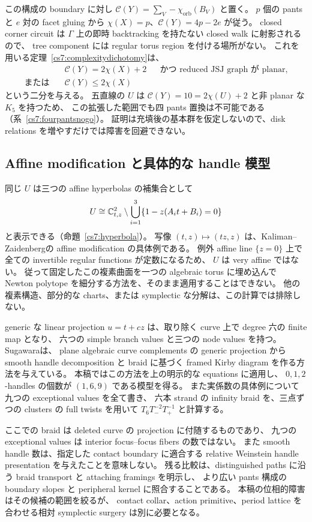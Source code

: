 この構成の boundary に対し
$\mathcal C(Y)=\sum_V-\chi_{\mathrm{orb}}(B_V)$ と置く。
$p$ 個の pants と $e$ 対の facet gluing から
$\chi(X)=p$、$\mathcal C(Y)=4p-2e$ が従う。
closed corner circuit は $\Gamma$ 上の即時 backtracking を持たない closed walk に射影されるので、
tree component には regular torus region を付ける場所がない。
これを用いる定理~\ref{cs7:complexitydichotomy}は、
\[
 \begin{aligned}
 &\mathcal C(Y)=2\chi(X)+2
   &&\text{かつ reduced JSJ graph が planar},\\
 \text{または}\quad
 &\mathcal C(Y)\leq2\chi(X)
 \end{aligned}
\]
という二分を与える。
五直線の $U$ は $\mathcal C(Y)=10=2\chi(U)+2$ と非 planar な $K_5$ を持つため、
この拡張した範囲でも四 pants 置換は不可能である（系~\ref{cs7:fourpantsnogo}）。
証明は充填後の基本群を仮定しないので、disk relations を増やすだけでは障害を回避できない。

\subsection{Affine modification と具体的な handle 模型}

同じ $U$ は三つの affine hyperbolas の補集合として
\[
 U\cong\mathbb C^2_{t,z}\setminus
       \bigcup_{i=1}^3\{1-z(A_it+B_i)=0\}
\]
と表示できる（命題~\ref{cs7:hyperbola}）。
写像 $(t,z)\mapsto(tz,z)$ は、Kaliman--Zaidenberg\cite[\S\S1--3]{KalimanZaidenberg}の
affine modification の具体例である。
例外 affine line $\{z=0\}$ 上で全ての invertible regular functions が定数になるため、
$U$ は very affine ではない。
従って固定したこの複素曲面を一つの algebraic torus に埋め込んで
Newton polytope を細分する方法を、そのまま適用することはできない。
他の複素構造、部分的な charts、または symplectic な分解は、この計算では排除しない。

generic な linear projection $u=t+cz$ は、取り除く curve 上で degree 六の finite map となり、
六つの simple branch values と三つの node values を持つ。
Sugawara\cite[Proposition~3.1, Theorems~3.7 and~4.1]{Sugawara}は、
plane algebraic curve complements の generic projection から smooth handle decomposition と
braid に基づく framed Kirby diagram を作る方法を与えている。
本稿ではこの方法を上の明示的な equations に適用し、
$0,1,2$-handles の個数が $(1,6,9)$ である模型を得る。
また実係数の具体例について九つの exceptional values を全て書き、
六本 strand の infinity braid を、三点ずつの clusters の full twists を用いて
$T_6T_-^{-2}T_+^{-1}$ と計算する。

ここでの braid は deleted curve の projection に付随するものであり、
九つの exceptional values は interior focus--focus fibers の数ではない。
また smooth handle 数は、指定した contact boundary に適合する
relative Weinstein handle presentation を与えたことを意味しない。
残る比較は、distinguished paths に沿う braid transport と attaching framings を明示し、
より広い pants 構成の boundary slopes と peripheral kernel に照合することである。
本稿の位相的障害はその候補の範囲を絞るが、
contact collar、action primitive、period lattice を合わせる相対 symplectic surgery は別に必要となる。
